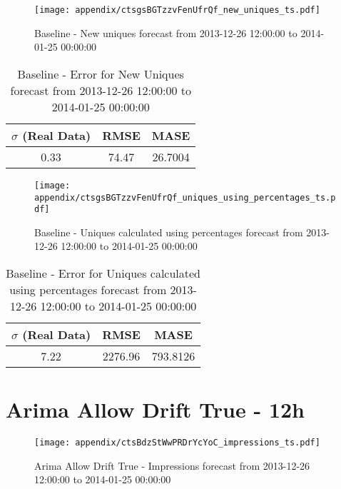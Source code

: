\begin{figure}[H] \begin{center} \leavevmode
\texttt{[image: appendix/ctsgsBGTzzvFenUfrQf\_new\_uniques\_ts.pdf]} \caption{
Baseline - New uniques forecast from 2013-12-26 12:00:00 to 2014-01-25 00:00:00} \label{fig:appendix/ctsgsBGTzzvFenUfrQf_new_uniques_ts.pdf} \end{center}
\end{figure}

\begin{table}[H]
\centering
\footnotesize
\begin{tabular}{ccc}
$\sigma$ (Real Data) & RMSE & MASE   \\ \hline
0.33 & 74.47 & 26.7004 \\
\end{tabular}

\vspace{0.5cm}

\caption{
Baseline - Error for New Uniques forecast from 2013-12-26 12:00:00 to 2014-01-25 00:00:00}
\end{table}

\begin{figure}[H] \begin{center} \leavevmode
\texttt{[image: appendix/ctsgsBGTzzvFenUfrQf\_uniques\_using\_percentages\_ts.pdf]} \caption{
Baseline - Uniques calculated using percentages forecast from 2013-12-26 12:00:00 to 2014-01-25 00:00:00} \label{fig:appendix/ctsgsBGTzzvFenUfrQf_uniques_using_percentages_ts.pdf} \end{center}
\end{figure}

\begin{table}[H]
\centering
\footnotesize
\begin{tabular}{ccc}
$\sigma$ (Real Data) & RMSE & MASE   \\ \hline
7.22 & 2276.96 & 793.8126 \\
\end{tabular}

\vspace{0.5cm}

\caption{
Baseline - Error for Uniques calculated using percentages forecast from 2013-12-26 12:00:00 to 2014-01-25 00:00:00}
\end{table}

\section{Arima Allow Drift True - 12h}
\begin{figure}[H] \begin{center} \leavevmode
\texttt{[image: appendix/ctsBdzStWwPRDrYcYoC\_impressions\_ts.pdf]} \caption{
Arima Allow Drift True - Impressions forecast from 2013-12-26 12:00:00 to 2014-01-25 00:00:00} \label{fig:appendix/ctsBdzStWwPRDrYcYoC_impressions_ts.pdf} \end{center}
\end{figure}

